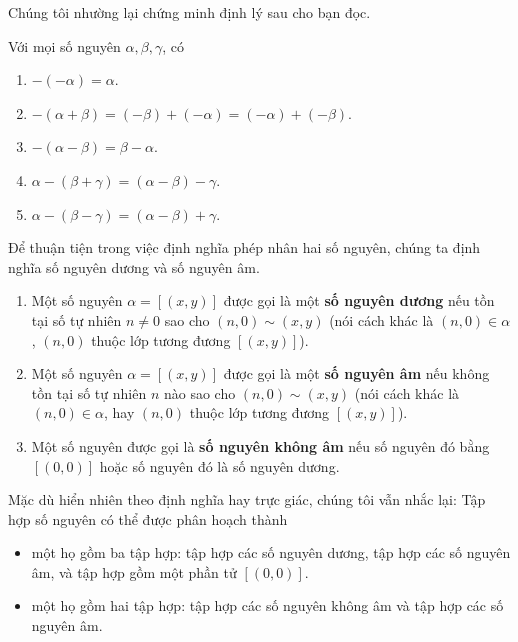 Chúng tôi nhường lại chứng minh định lý sau cho bạn đọc.
\begin{theorem}
    Với mọi số nguyên $\alpha, \beta, \gamma$, có
    \begin{enumerate}[label={(\roman*)}]
        \item $-(-\alpha) = \alpha$.
        \item $-(\alpha + \beta) = (-\beta) + (-\alpha) = (-\alpha) + (-\beta)$.
        \item $-(\alpha - \beta) = \beta - \alpha$.
        \item $\alpha - (\beta + \gamma) = (\alpha - \beta) - \gamma$.
        \item $\alpha - (\beta - \gamma) = (\alpha - \beta) + \gamma$.
    \end{enumerate}
\end{theorem}

Để thuận tiện trong việc định nghĩa phép nhân hai số nguyên, chúng ta định nghĩa số nguyên dương và số nguyên âm.
\begin{definition}
    \begin{enumerate}[label={(\roman*)}]
        \item Một số nguyên $\alpha = [(x, y)]$ được gọi là một \textbf{số nguyên dương} nếu tồn tại số tự nhiên $n\ne 0$ sao cho $(n, 0)\sim (x, y)$ (nói cách khác là $(n, 0)\in \alpha$, $(n, 0)$ thuộc lớp tương đương $[(x, y)]$).
        \item Một số nguyên $\alpha = [(x, y)]$ được gọi là một \textbf{số nguyên âm} nếu không tồn tại số tự nhiên $n$ nào sao cho $(n, 0)\sim (x, y)$ (nói cách khác là $(n, 0)\in \alpha$, hay $(n, 0)$ thuộc lớp tương đương $[(x, y)]$).
        \item Một số nguyên được gọi là \textbf{số nguyên không âm} nếu số nguyên đó bằng $[(0, 0)]$ hoặc số nguyên đó là số nguyên dương.
    \end{enumerate}
\end{definition}

Mặc dù hiển nhiên theo định nghĩa hay trực giác, chúng tôi vẫn nhắc lại: Tập hợp số nguyên có thể được phân hoạch thành
\begin{itemize}
    \item một họ gồm ba tập hợp: tập hợp các số nguyên dương, tập hợp các số nguyên âm, và tập hợp gồm một phần tử $[(0,0)]$.
    \item một họ gồm hai tập hợp: tập hợp các số nguyên không âm và tập hợp các số nguyên âm.
\end{itemize}

